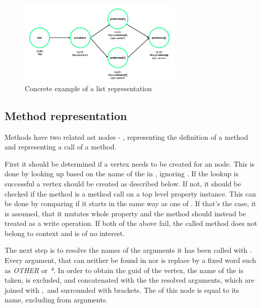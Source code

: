 \begin{figure}[H]
    \centering
    \includegraphics[width=0.7\textwidth]{images/graph_list.png}
     \caption{Concrete example of a list representation}
     \label{fig:graph_list}
\end{figure}

\subsection{Method representation}
\label{concept:methods}
Methods have two related \gls{ast} nodes - , representing the definition of a method and  representing a call of a method. 

First it should be determined if a vertex needs to be created for an  node. This is done by looking up based on the name of the  in , ignoring . If the lookup is successful a vertex should be created as described below. If not, it should be checked if the method is a method call on a top level property instance. This can be done by comparing if it starts in the same way as one of . %
If that's the case, it is assumed, that it mutates whole property and the method should instead be treated as a write operation.
If both of the above fail, the called method does not belong to context and is of no interest.

The next step is to resolve the names of the arguments it has been called with . Every argument, that can neither be found in  nor  is replace by a fixed word such as \textit{OTHER} or \textit{*}. In order to obtain the \gls{guid} of the vertex, the name of the  is taken,  is excluded, and concatenated with the the resolved arguments, which are joined with $,$ and surrounded with brackets. The  of this node is equal to its name, excluding  from arguments. 


